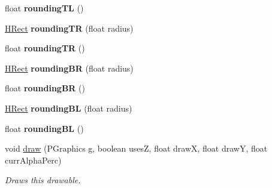 \begin{DoxyCompactItemize}
\item 
\hypertarget{classhype_1_1drawable_1_1_h_rect_a765e79a1a12db4eadee8d04c2f6dc779}{float {\bfseries rounding\-T\-L} ()}\label{classhype_1_1drawable_1_1_h_rect_a765e79a1a12db4eadee8d04c2f6dc779}

\item 
\hypertarget{classhype_1_1drawable_1_1_h_rect_a45caa227a5f1d8d5c81b534ebed047e0}{\hyperlink{classhype_1_1drawable_1_1_h_rect}{H\-Rect} {\bfseries rounding\-T\-R} (float radius)}\label{classhype_1_1drawable_1_1_h_rect_a45caa227a5f1d8d5c81b534ebed047e0}

\item 
\hypertarget{classhype_1_1drawable_1_1_h_rect_a7c79febd61c038934a1b8018f519ccda}{float {\bfseries rounding\-T\-R} ()}\label{classhype_1_1drawable_1_1_h_rect_a7c79febd61c038934a1b8018f519ccda}

\item 
\hypertarget{classhype_1_1drawable_1_1_h_rect_a4a1cacf3d57d913d12bb556995f12892}{\hyperlink{classhype_1_1drawable_1_1_h_rect}{H\-Rect} {\bfseries rounding\-B\-R} (float radius)}\label{classhype_1_1drawable_1_1_h_rect_a4a1cacf3d57d913d12bb556995f12892}

\item 
\hypertarget{classhype_1_1drawable_1_1_h_rect_a096f9a60d0654c3fc05d51d5741b917e}{float {\bfseries rounding\-B\-R} ()}\label{classhype_1_1drawable_1_1_h_rect_a096f9a60d0654c3fc05d51d5741b917e}

\item 
\hypertarget{classhype_1_1drawable_1_1_h_rect_a52eda9ea544fe6feb1eeef50ac8d03e4}{\hyperlink{classhype_1_1drawable_1_1_h_rect}{H\-Rect} {\bfseries rounding\-B\-L} (float radius)}\label{classhype_1_1drawable_1_1_h_rect_a52eda9ea544fe6feb1eeef50ac8d03e4}

\item 
\hypertarget{classhype_1_1drawable_1_1_h_rect_a049a529b6800428757a8211107096ef6}{float {\bfseries rounding\-B\-L} ()}\label{classhype_1_1drawable_1_1_h_rect_a049a529b6800428757a8211107096ef6}

\item 
void \hyperlink{classhype_1_1drawable_1_1_h_rect_a9eec0e9b23abc0ddf61c641d9de7f293}{draw} (P\-Graphics g, boolean uses\-Z, float draw\-X, float draw\-Y, float curr\-Alpha\-Perc)
\begin{DoxyCompactList}\small\item\em Draws this drawable. \end{DoxyCompactList}\end{DoxyCompactItemize}
